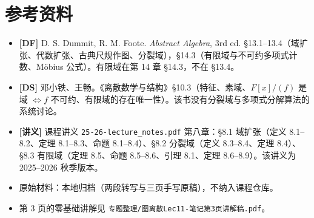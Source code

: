 \documentclass[UTF8,a4paper,11pt]{ctexart}
\begin{document}
\section*{参考资料}
\begin{itemize}
\item \textbf{[DF]} D. S. Dummit, R. M. Foote. \emph{Abstract Algebra}, 3rd ed. §13.1--13.4（域扩张、代数扩张、古典尺规作图、分裂域），§14.3（有限域与不可约多项式计数、Möbius 公式）。有限域在第 14 章 §14.3，不在 §13.4。
\item \textbf{[DS]} 邓小铁、王畅。《离散数学与结构》§10.3（特征、素域、$F[x]/(f)$ 是域 $\iff f$ 不可约、有限域的存在唯一性）。该书没有分裂域与多项式分解算法的系统讨论。
\item \textbf{[讲义]} 课程讲义 \texttt{25-26-lecture\_notes.pdf} 第八章：§8.1 域扩张（定义 8.1--8.2、定理 8.1--8.3、命题 8.1--8.4）、§8.2 分裂域（定义 8.3--8.4、定理 8.4）、§8.3 有限域（定理 8.5、命题 8.5--8.6、引理 8.1、定理 8.6--8.9）。该讲义为 2025--2026 秋季版本。
\item 原始材料：本地归档（两段转写与三页手写原稿），不纳入课程仓库。
\item 第 3 页的零基础讲解见 \texttt{专题整理/图离散Lec11-笔记第3页讲解稿.pdf}。
\end{itemize}
\end{document}
